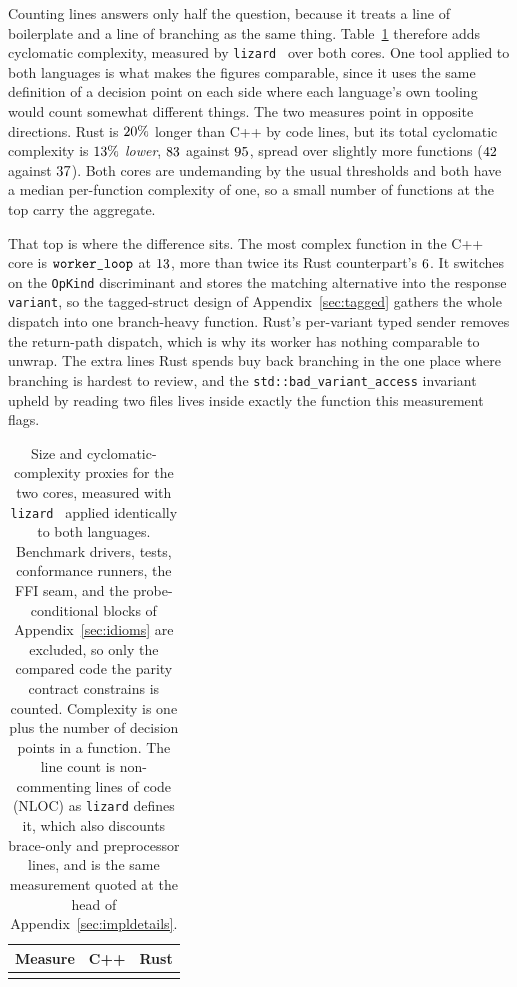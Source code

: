 \documentclass[english,oneside,a4paper,censored,csm,software-track-2020]{HYthesisML}
\begin{document}
\begin{appendices}
Counting lines answers only half the question, because it treats a line of boilerplate and a line
of branching as the same thing. Table~\ref{tab:complexity} therefore adds cyclomatic complexity,
measured by \texttt{lizard}~\cite{lizard} over both cores. One tool applied to both languages is
what makes the figures comparable, since it uses the same definition of a decision point on each
side where each language's own tooling would count somewhat different things. The two measures
point in opposite directions. Rust is $20\%$ longer than C++ by code lines, but its total
cyclomatic complexity is $13\%$ \emph{lower}, $83$ against $95$,
spread over slightly more functions ($42$ against $37$). Both cores are
undemanding by the usual thresholds and both have a median per-function complexity of one, so a
small number of functions at the top carry the aggregate.

That top is where the difference sits. The most complex function in the C++ core is
$\texttt{worker\_loop}$ at $13$, more than twice its Rust counterpart's $6$. It switches
on the \texttt{OpKind} discriminant and stores the matching alternative into the response
\texttt{variant}, so the tagged-struct design of Appendix~\ref{sec:tagged} gathers the whole
dispatch into one branch-heavy function. Rust's per-variant typed sender removes the return-path
dispatch, which is why its worker has nothing comparable to unwrap. The extra lines Rust spends
buy back branching in the one place where branching is hardest to review, and the
\texttt{std::bad\_variant\_access} invariant upheld by reading two files lives inside exactly the
function this measurement flags.

\begin{table}[H]
\centering
\small
\caption[Size and cyclomatic-complexity proxies for the two cores]{Size and cyclomatic-complexity proxies for the two cores, measured with
\texttt{lizard}~\cite{lizard} applied identically to both languages. Benchmark drivers, tests,
conformance runners, the FFI seam, and the probe-conditional blocks of
Appendix~\ref{sec:idioms} are excluded, so only the compared code the parity contract constrains
is counted. Complexity is one plus the number of decision points in a function. The line count
is non-commenting lines of code (NLOC) as \texttt{lizard} defines it, which also discounts
brace-only and preprocessor lines, and is the same measurement quoted at the head of
Appendix~\ref{sec:impldetails}.\label{tab:complexity}}
\begin{tabular}{@{}l r r@{}}
\hline\hline
Measure & C++ & Rust \\
\hline
\\
\hline
\end{tabular}
\end{table}


\end{appendices}
\end{document}
